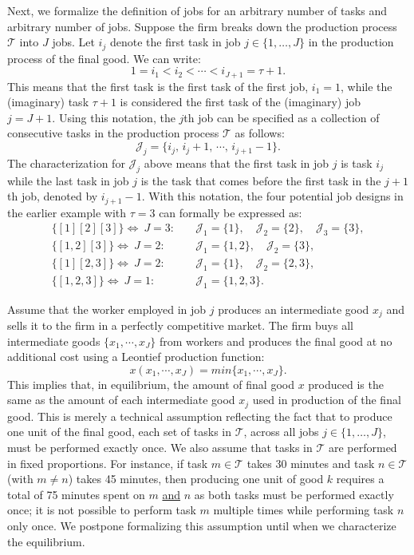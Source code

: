 \documentclass{article}
\theoremstyle{plain}
\theoremstyle{plain}
\begin{document}
Next, we formalize the definition of jobs for an arbitrary number of tasks and arbitrary number of jobs.
Suppose the firm breaks down the production process $\mathcal{T}$ into $J$ jobs.
Let $i_j$ denote the first task in job $j \in \{1,\ldots,J\}$ in the production process of the final good.
We can write:
\[
1 = i_1 < i_2 < \cdots < i_{J+1} = \tau+1.
\]
This means that the first task is the first task of the first job, $i_1=1$, while the (imaginary) task $\tau+1$ is considered the first task of the (imaginary) job $j = J+1$.
Using this notation, the $j$th job can be specified as a collection of consecutive tasks in the production process $\mathcal{T}$ as follows:
\[
\mathcal{J}_j = \{i_j, \, i_j+1, \, \cdots, \, i_{j+1} - 1\}.
\]
The characterization for $\mathcal{J}_j$ above means that the first task in job $j$ is task $i_j$ while the last task in job $j$ is the task that comes before the first task in the $j+1$th job, denoted by $i_{j+1}-1$.
With this notation, the four potential job designs in the earlier example with $\tau=3$ can formally be expressed as:
\begin{align*}
\{[1][2][3]\} \Longleftrightarrow \ J = 3:  & \quad \mathcal{J}_1 = \{1\}, \quad  \mathcal{J}_2 = \{2\}, \quad \mathcal{J}_3 = \{3\}, \\
\{[1,2][3]\} \Longleftrightarrow \ J = 2: & \quad \mathcal{J}_1 = \{1, 2\},  \quad \mathcal{J}_2 = \{3\}, \\
\{[1][2,3]\} \Longleftrightarrow \ J = 2: & \quad \mathcal{J}_1 = \{1\}, \quad \mathcal{J}_2 = \{2, 3\}, \\
\{[1,2,3]\} \Longleftrightarrow \ J = 1: & \quad \mathcal{J}_1 = \{1,2,3\}.
\end{align*}

Assume that the worker employed in job $j$ produces an intermediate good $x_j$ and sells it to the firm in a perfectly competitive market.
The firm buys all intermediate goods $\{x_1, \cdots, x_J\}$ from workers and produces the final good at no additional cost using a Leontief production function:
\[
x(x_1, \cdots, x_J) = min\{x_1, \cdots, x_J\}.
\]
This implies that, in equilibrium, the amount of final good $x$ produced is the same as the amount of each intermediate good $x_j$ used in production of the final good.
This is merely a technical assumption reflecting the fact that to produce one unit of the final good, each set of tasks in $\mathcal{T}$, across all jobs $j \in \{1,\ldots,J\}$, must be performed exactly once.
We also assume that tasks in $\mathcal{T}\!$ are performed in fixed proportions.
For instance, if task $m \in \mathcal{T}$ takes 30 minutes and task $n \in \mathcal{T}$ (with $m \neq n$) takes 45 minutes, then producing one unit of good $k$ requires a total of 75 minutes spent on $m$ \underline{and} $n$ as both tasks must be performed exactly once; it is not possible to perform task $m$ multiple times while performing task $n$ only once.
We postpone formalizing this assumption until when we characterize the equilibrium.
\end{document}
